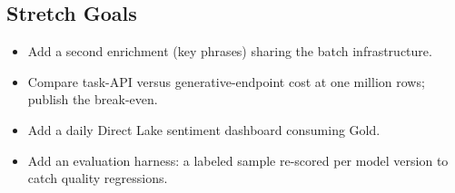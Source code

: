\subsection*{Stretch Goals}
\begin{itemize}
    \item Add a second enrichment (key phrases) sharing the batch infrastructure.
    \item Compare task-API versus generative-endpoint cost at one million rows; publish the break-even.
    \item Add a daily Direct Lake sentiment dashboard consuming Gold.
    \item Add an evaluation harness: a labeled sample re-scored per model version to catch quality regressions.
\end{itemize}
